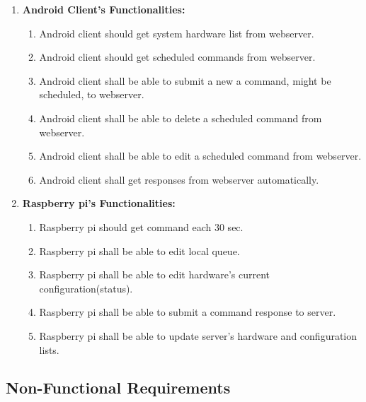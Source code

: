 \documentclass[12pt, oneside, a4paper]{book}
\newcommand\boldcolor[1]{\textcolor{bold}{\textbf{#1}}}
\begin{document}
				\begin{enumerate}[label=3.2.3.\arabic*]
					\item \boldcolor{Android Client's Functionalities:}
					\begin{enumerate}
						\item Android client should get system hardware list from
						webserver.
						\item Android client should get scheduled commands from webserver.
						\item Android client shall be able to submit a new a command, might be scheduled,
						to webserver.
						
						\item Android client shall be able to delete a scheduled command from webserver.
						\item Android client shall be able to edit a scheduled command from webserver.
						\item Android client shall get responses from webserver automatically.
					\end{enumerate}
					\item \boldcolor{Raspberry pi's Functionalities:}
					\begin{enumerate}
						\item Raspberry pi should get command each 30 sec.
						\item Raspberry pi shall be able to edit local queue.
						\item Raspberry pi shall be able to edit hardware's current configuration(status).
						\item Raspberry pi shall be able to submit a command response to server.
						\item Raspberry pi shall be able to update server's hardware and configuration lists.
					\end{enumerate}
				\end{enumerate}
			\newpage\subsection{Non-Functional Requirements}
				\def\arraystretch{1.5}
\end{document}
